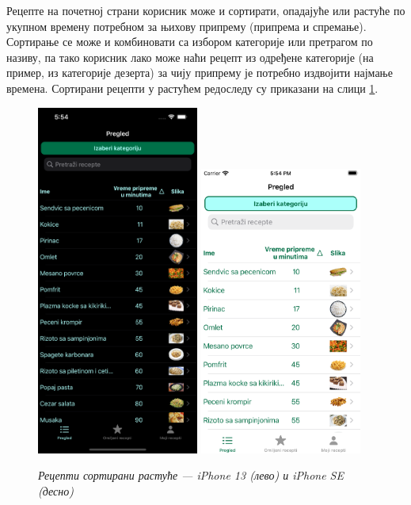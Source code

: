 \documentclass[12pt,oneside]{memoir}
\begin{document}
\indent Рецепте на почетној страни корисник може и сортирати, опадајуће или растуће по укупном времену потребном за њихову припрему (припрема и спремање). Сортирање се може и комбиновати са избором категорије или претрагом по називу, па тако корисник лако може наћи рецепт из одређене категорије (на пример, из категорије дезерта) за чију припрему је потребно издвојити најмање времена. Сортирани рецепти у растућем редоследу су приказани на слици \ref{slika:сортирање_растуће_1}.

\begin{figure} [H]
    \centering
    \captionsetup{justification=centering}
    \includegraphics[width=0.475\textwidth]{images/simulators/view images/dark - sort asc.png}
    \hfill
    \includegraphics[width=0.475\textwidth]{images/simulators/view images/light - sort asc.png} 
    \caption{\textit{Рецепти сортирани растуће --- iPhone 13 (лево) и iPhone SE (десно)}}
    \label{slika:сортирање_растуће_1}
\end{figure}
\end{document}
